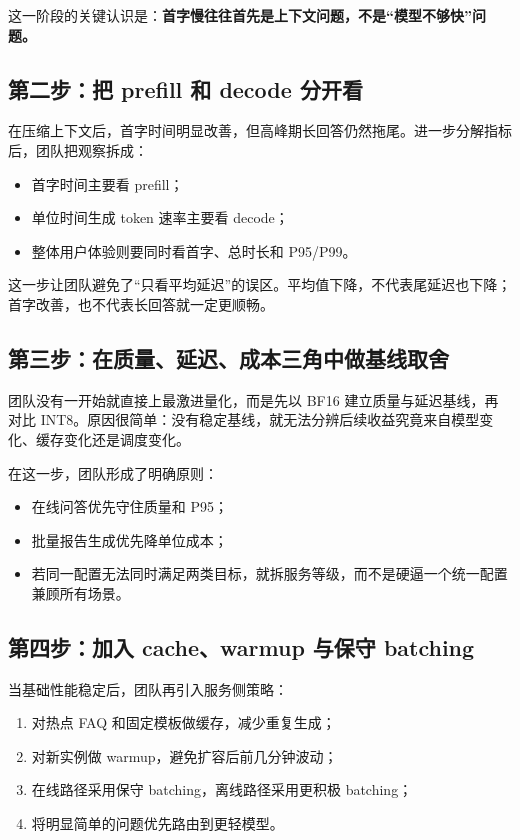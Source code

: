 这一阶段的关键认识是：\textbf{首字慢往往首先是上下文问题，不是“模型不够快”问题。}

\subsection{第二步：把 prefill 和 decode 分开看}
在压缩上下文后，首字时间明显改善，但高峰期长回答仍然拖尾。进一步分解指标后，团队把观察拆成：
\begin{itemize}
  \item 首字时间主要看 prefill；
  \item 单位时间生成 token 速率主要看 decode；
  \item 整体用户体验则要同时看首字、总时长和 P95/P99。
\end{itemize}

这一步让团队避免了“只看平均延迟”的误区。平均值下降，不代表尾延迟也下降；首字改善，也不代表长回答就一定更顺畅。

\subsection{第三步：在质量、延迟、成本三角中做基线取舍}
团队没有一开始就直接上最激进量化，而是先以 BF16 建立质量与延迟基线，再对比 INT8。原因很简单：没有稳定基线，就无法分辨后续收益究竟来自模型变化、缓存变化还是调度变化。

在这一步，团队形成了明确原则：
\begin{itemize}
  \item 在线问答优先守住质量和 P95；
  \item 批量报告生成优先降单位成本；
  \item 若同一配置无法同时满足两类目标，就拆服务等级，而不是硬逼一个统一配置兼顾所有场景。
\end{itemize}

\subsection{第四步：加入 cache、warmup 与保守 batching}
当基础性能稳定后，团队再引入服务侧策略：
\begin{enumerate}
  \item 对热点 FAQ 和固定模板做缓存，减少重复生成；
  \item 对新实例做 warmup，避免扩容后前几分钟波动；
  \item 在线路径采用保守 batching，离线路径采用更积极 batching；
  \item 将明显简单的问题优先路由到更轻模型。
\end{enumerate}

